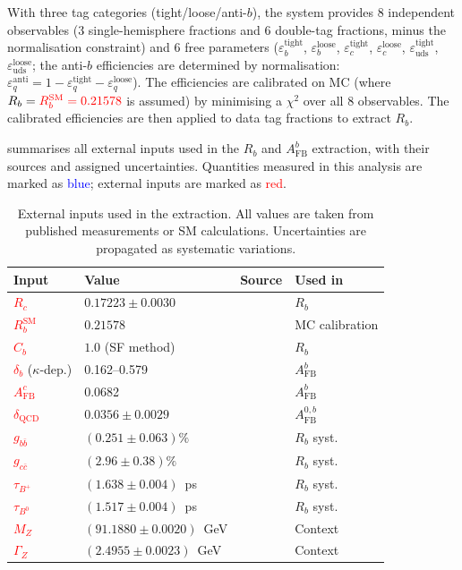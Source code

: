 \documentclass[11pt,a4paper]{article}
\newcommand{\measured}[1]{\textcolor{blue}{#1}}
\newcommand{\external}[1]{\textcolor{red}{#1}}
\begin{document}
With three tag categories (tight/loose/anti-$b$), the system
provides 8 independent observables (3 single-hemisphere fractions
and 6 double-tag fractions, minus the normalisation constraint)
and 6 free parameters
($\varepsilon_b^\text{tight}$, $\varepsilon_b^\text{loose}$,
$\varepsilon_c^\text{tight}$, $\varepsilon_c^\text{loose}$,
$\varepsilon_\text{uds}^\text{tight}$, $\varepsilon_\text{uds}^\text{loose}$;
the anti-$b$ efficiencies are determined by normalisation:
$\varepsilon_q^\text{anti} = 1 - \varepsilon_q^\text{tight} - \varepsilon_q^\text{loose}$).
The efficiencies are calibrated on MC (where
$R_b = \external{R_b^\text{SM} = 0.21578}$ is assumed) by
minimising a $\chi^2$ over all 8 observables.
The calibrated efficiencies are then applied to data tag fractions
to extract $R_b$.

 summarises all external inputs used in
the $R_b$ and $A_\text{FB}^b$ extraction, with their sources and
assigned uncertainties.
Quantities measured in this analysis are marked as \measured{blue};
external inputs are marked as \external{red}.

\begin{table}[htbp]
\centering
\caption{External inputs used in the extraction.
All values are taken from published measurements or SM calculations.
Uncertainties are propagated as systematic variations.}
\label{tbl:external_inputs}
\begin{tabular}{llll}
\toprule
Input & Value & Source & Used in \\
\midrule
\external{$R_c$} & $0.17223 \pm 0.0030$ & \cite{LEP:EWWG:2005} & $R_b$ \\
\external{$R_b^\text{SM}$} & $0.21578$ & \cite{LEP:EWWG:2005} & MC calibration \\
\external{$C_b$} & $1.0$ (SF method) & \cite{ALEPH:Rb:1996} & $R_b$ \\
\external{$\delta_b$} ($\kappa$-dep.) & 0.162--0.579 & \cite{LEP:EWWG:2005} & $A_\text{FB}^b$ \\
\external{$A_\text{FB}^c$} & 0.0682 & \cite{LEP:EWWG:2005} & $A_\text{FB}^b$ \\
\external{$\delta_\text{QCD}$} & $0.0356 \pm 0.0029$ & \cite{LEP:EWWG:2005} & $A_\text{FB}^{0,b}$ \\
\external{$g_{b\bar{b}}$} & $(0.251 \pm 0.063)\%$ & \cite{ALEPH:gbb} & $R_b$ syst. \\
\external{$g_{c\bar{c}}$} & $(2.96 \pm 0.38)\%$ & \cite{LEP:gcc} & $R_b$ syst. \\
\external{$\tau_{B^+}$} & $(1.638 \pm 0.004)$~ps & \cite{PDG:2024} & $R_b$ syst. \\
\external{$\tau_{B^0}$} & $(1.517 \pm 0.004)$~ps & \cite{PDG:2024} & $R_b$ syst. \\
\external{$M_Z$} & $(91.1880 \pm 0.0020)$~GeV & \cite{PDG:2024} & Context \\
\external{$\Gamma_Z$} & $(2.4955 \pm 0.0023)$~GeV & \cite{PDG:2024} & Context \\
\bottomrule
\end{tabular}
\end{table}
\end{document}
